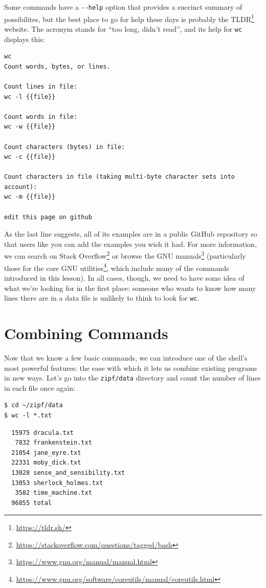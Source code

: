 \documentclass[
]{krantz}
\renewcommand{\href}[2]{#2\footnote{\url{#1}}}
\begin{document}
Some commands have a \texttt{-\/-help} option that provides a succinct summary of possibilites,
but the best place to go for help these days is probably the \href{https://tldr.sh/}{TLDR} website.
The acronym stands for ``too long, didn't read'',
and its help for \texttt{wc} displays this:

\begin{verbatim}
wc
Count words, bytes, or lines.

Count lines in file:
wc -l {{file}}

Count words in file:
wc -w {{file}}

Count characters (bytes) in file:
wc -c {{file}}

Count characters in file (taking multi-byte character sets into account):
wc -m {{file}}

edit this page on github
\end{verbatim}

As the last line suggests,
all of its examples are in a public GitHub repository
so that users like you can add the examples you wish it had.
For more information,
we can search on \href{https://stackoverflow.com/questions/tagged/bash}{Stack Overflow}
or browse the \href{https://www.gnu.org/manual/manual.html}{GNU manuals}
(particularly those for the \href{https://www.gnu.org/software/coreutils/manual/coreutils.html}{core GNU utilities},
which include many of the commands introduced in this lesson).
In all cases,
though,
we need to have some idea of what we're looking for in the first place:
someone who wants to know how many lines there are in a data file
is unlikely to think to look for \texttt{wc}.

\hypertarget{bash-basics-pipe}{%
\section{Combining Commands}\label{bash-basics-pipe}}

Now that we know a few basic commands,
we can introduce one of the shell's most powerful features:
the ease with which it lets us combine existing programs in new ways.
Let's go into the \texttt{zipf/data} directory
and count the number of lines in each file once again:

\begin{verbatim}
$ cd ~/zipf/data
$ wc -l *.txt
\end{verbatim}

\begin{verbatim}
  15975 dracula.txt
   7832 frankenstein.txt
  21054 jane_eyre.txt
  22331 moby_dick.txt
  13028 sense_and_sensibility.txt
  13053 sherlock_holmes.txt
   3582 time_machine.txt
  96855 total
\end{verbatim}
\end{document}
